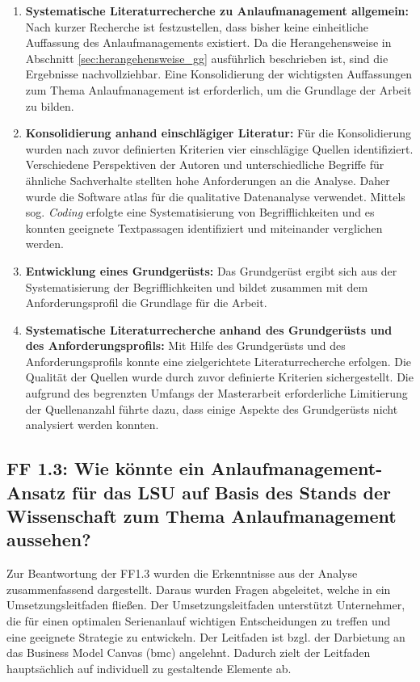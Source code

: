 \begin{enumerate}
 \item \textbf{Systematische Literaturrecherche zu Anlaufmanagement allgemein: } Nach kurzer Recherche ist festzustellen, dass bisher keine einheitliche Auffassung des Anlaufmanagements existiert. Da die Herangehensweise in Abschnitt \ref{sec:herangehensweise_gg} ausführlich beschrieben ist, sind die Ergebnisse nachvollziehbar. Eine Konsolidierung der wichtigsten Auffassungen zum Thema Anlaufmanagement ist erforderlich, um die Grundlage der Arbeit zu bilden. 
 \item \textbf{Konsolidierung anhand einschlägiger Literatur: } Für die Konsolidierung wurden nach zuvor definierten Kriterien vier einschlägige Quellen identifiziert. 
 Verschiedene Perspektiven der Autoren und unterschiedliche Begriffe für ähnliche Sachverhalte stellten hohe Anforderungen an die Analyse. Daher wurde die Software \gls{atlas} für die qualitative Datenanalyse verwendet. Mittels sog. \textit{Coding} erfolgte eine Systematisierung von Begrifflichkeiten und es konnten geeignete Textpassagen identifiziert und miteinander verglichen werden. 
 \item \textbf{Entwicklung eines Grundgerüsts: } Das Grundgerüst ergibt sich aus der Systematisierung der Begrifflichkeiten und bildet zusammen mit dem Anforderungsprofil die Grundlage für die Arbeit. 
 \item \textbf{Systematische Literaturrecherche anhand des Grundgerüsts und des Anforderungsprofils: } Mit Hilfe des Grundgerüsts und des Anforderungsprofils konnte eine zielgerichtete Literaturrecherche erfolgen. Die Qualität der Quellen wurde durch zuvor definierte Kriterien sichergestellt. 
 Die aufgrund des begrenzten Umfangs der Masterarbeit erforderliche Limitierung der Quellenanzahl führte dazu, dass einige Aspekte des Grundgerüsts nicht analysiert werden konnten. %
\end{enumerate}

\subsection*{FF 1.3: Wie könnte ein Anlaufmanagement-Ansatz für das LSU auf Basis des Stands der Wissenschaft zum Thema Anlaufmanagement aussehen?}
Zur Beantwortung der FF1.3 wurden die Erkenntnisse aus der Analyse zusammenfassend dargestellt. Daraus wurden Fragen abgeleitet, welche in ein Umsetzungsleitfaden fließen. Der Umsetzungsleitfaden unterstützt Unternehmer, die für einen optimalen Serienanlauf wichtigen Entscheidungen zu treffen und eine geeignete Strategie zu entwickeln. Der Leitfaden ist bzgl. der Darbietung an das Business Model Canvas (\gls{bmc}) %
angelehnt. Dadurch zielt der Leitfaden hauptsächlich auf individuell zu gestaltende Elemente ab.

